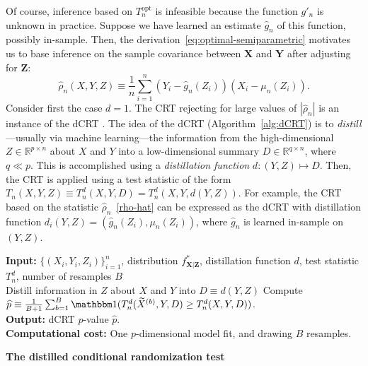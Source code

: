 \documentclass[12pt]{article}
\let\oldnl\nl%
\newcommand{\nonl}{\renewcommand{\nl}{\let\nl\oldnl}}%
\theoremstyle{definition}
\theoremstyle{remark}
\newcommand{\prx}{\bm X}
\newcommand{\srx}{X}
\newcommand{\prz}{\bm Z}
\newcommand{\srz}{Z}
\newcommand{\srxk}{\widetilde X}
\newcommand{\pry}{{\bm Y}}
\newcommand{\sry}{Y}
\begin{document}
Of course, inference based on $T_n^{\text{opt}}$ is infeasible because the function $g'_n$ is unknown in practice. Suppose we have learned an estimate $\widehat g_n$ of this function, possibly in-sample. Then, the derivation~\eqref{eq:optimal-semiparametric} motivates us to base inference on the sample covariance between $\prx$ and $\pry$ after adjusting for $\prz$:
\begin{equation}
	\widehat \rho_n(\srx, \sry, \srz) \equiv \frac1n\sum_{i = 1}^n (\sry_{i} - \widehat g_n(\srz_{i}))(\srx_{i} - \mu_n(\srz_i)).
	\label{rho-hat}
\end{equation}
Consider first the case $d = 1$. The CRT rejecting for large values of $|\widehat \rho_n|$ is an instance of the dCRT \cite{Liu2020}. The idea of the dCRT (Algorithm~\ref{alg:dCRT}) is to \textit{distill}---usually via machine learning---the information from the high-dimensional $\srz \in \mathbb R^{p \times n}$ about $\srx$ and $\sry$ into a low-dimensional summary $D \in \mathbb R^{q \times n}$,  where $q \ll p$. This is accomplished using a \textit{distillation function} $d: (\sry, \srz) \mapsto D$. Then, the CRT is applied using a test statistic of the form $T_n(\srx, \sry, \srz) \equiv T_n^d(\srx, \sry, D) = T_n^d(\srx, \sry, d(\sry, \srz))$. For example, the CRT based on the statistic $\widehat \rho_n$~\eqref{rho-hat} can be expressed as the dCRT with distillation function $d_i(\sry, \srz) = (\widehat g_n(\srz_i), \mu_n(Z_i))$, where $\widehat g_n$ is learned in-sample on $(\sry, \srz)$. 

\begin{center}
	\begin{minipage}{\linewidth}
		\begin{algorithm}[H]
			\nonl  \textbf{Input:} $\{(\srx_i, \sry_i, \srz_i)\}_{i=1}^n$, distribution  $f^*_{\prx|\prz}$, distillation function $d$, test statistic $T_n^d$, number of resamples $B$\\
			Distill information in $\srz$ about $\srx$ and $\sry$ into $D \equiv d(\sry, \srz)$\;
			\For{$b = 1, 2, \dots, B$}{
				Resample $\srxk_i^{(b)} \overset{\text{ind}}\sim f^*_{\prx|\prz = \srz_i},\ i = 1, \dots, n$\;
			}
			Compute $\widehat p \equiv \frac{1}{B+1}\sum_{b = 1}^B \mathbbm 1(T_n^d(\srxk^{(b)}, \sry, D) \geq T_n^d(\srx, \sry, D))$.\\
			\nonl \textbf{Output:} dCRT $p$-value $\widehat p$.\\
			\nonl \textbf{Computational cost:} One $p$-dimensional model fit, and drawing $B$ resamples.
			\caption{\bf The distilled conditional randomization test}
			\label{alg:dCRT}
		\end{algorithm}
	\end{minipage}
\end{center}
\end{document}
